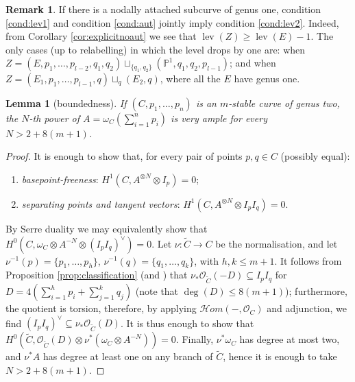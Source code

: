 \documentclass[11pt]{amsart}
\newcommand{\PP}{\mathbb P}
\newcommand{\OO}{\mathcal O}
\renewcommand{\to}{\rightarrow}
\newcommand{\hhom}{\mathcal{H}\!om}
\newcommand{\lev}{\operatorname{lev}}
\theoremstyle{plain}
\newtheorem{lem}[thm]{Lemma}
\theoremstyle{definition}
\newtheorem{rem}[thm]{Remark}
\begin{document}
\begin{rem}\label{rmk:lev1solev2}
 If there is a nodally attached subcurve of genus one, condition \eqref{cond:lev1} and condition \eqref{cond:aut} jointly imply condition \eqref{cond:lev2}. Indeed, from Corollary \ref{cor:explicitnoaut} we see that $\lev(Z)\geq\lev(E)-1$. The only cases (up to relabelling) in which the level drops by one are: when $Z=(E,p_1,\ldots,p_{l-2},q_1,q_2)\sqcup_{\{q_1,q_2\}}(\PP^1,q_1,q_2,p_{l-1})$; and when $Z=(E_1,p_1,\ldots,p_{l-1},q)\sqcup_q(E_2,q)$, where all the $E$ have genus one.
\end{rem}


\begin{lem}[boundedness]
 If $(C,p_1,\ldots,p_n)$ is an $m$-stable curve of genus two, the $N$-th power of $A=\omega_C(\sum_{i=1}^np_i)$ is very ample for every $N>2+8(m+1)$.
\end{lem}
\begin{proof}
 It is enough to show that, for every pair of points $p,q\in C$ (possibly equal):
 \begin{enumerate}
  \item \emph{basepoint-freeness}: $H^1(C,A^{\otimes N}\otimes I_p)=0$;
  \item \emph{separating points and tangent vectors}: $H^1(C,A^{\otimes N}\otimes I_pI_q)=0$.
 \end{enumerate}
By Serre duality we may equivalently show that $H^0(C,\omega_C\otimes A^{-N}\otimes(I_pI_q)^\vee)=0$. Let $\nu\colon\tilde C\to C$ be the normalisation, and let $\nu^{-1}(p)=\{p_1,\ldots,p_h\}$, $\nu^{-1}(q)=\{q_1,\ldots,q_k\}$, with $h,k\leq m+1$. It follows from Proposition \ref{prop:classification} (and \cite[Proposition A.3]{SMY1}) that $\nu_*\OO_{\tilde C}(-D)\subseteq I_pI_q$ for $D=4(\sum_{i=1}^hp_i+\sum_{j=1}^kq_j)$ (note that $\deg(D)\leq 8(m+1)$); furthermore, the quotient is torsion, therefore, by applying $\hhom(-,\OO_C)$ and adjunction, we find $(I_pI_q)^\vee\subseteq\nu_*\OO_{\tilde C}(D)$. It is thus enough to show that $H^0(\tilde C,\OO_{\tilde C}(D)\otimes\nu^*(\omega_C\otimes A^{-N}))=0$. Finally, $\nu^*\omega_C$ has degree at most two, and $\nu^*A$ has degree at least one on any branch of $\tilde C$, hence it is enough to take $N>2+8(m+1)$.
\end{proof}
\end{document}
